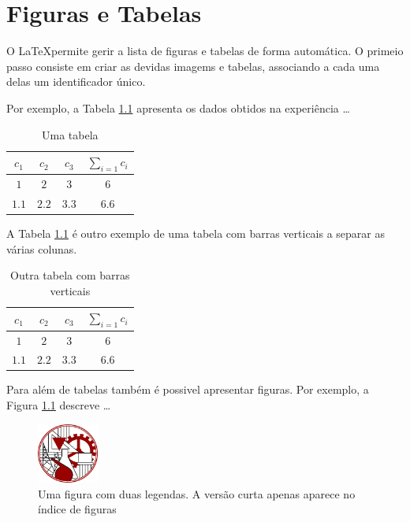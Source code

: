 \chapter{Figuras e Tabelas}
\label{ch:Misch}

O \LaTeX permite gerir a lista de figuras e tabelas de forma automática. O primeio passo consiste em criar as
 devidas imagems e tabelas, associando a cada uma delas um identificador único.

Por exemplo, a Tabela \ref{tab:umaTabela} apresenta os dados obtidos na experiência \ldots
\begin{table}[h]
	\centering
	\caption{Uma tabela}
	\begin{tabular}{ c c c c }
		\hline \hline
		$c_1$ & $c_2$ & $c_3$ & $\sum_{i=1} c_i$ \\
		\hline \hline
		$1$ & $2$ & $3$ & $6$ \\
		$1.1$ & $2.2$ & $3.3$ & $6.6$ \\
		\hline \hline
	\end{tabular}
	\label{tab:umaTabela}
\end{table}

A Tabela \ref{tab:umaTabela} é outro exemplo de uma tabela com barras verticais a separar as várias colunas.

\begin{table}[h]
	\centering
	\caption{Outra tabela com barras verticais}
	\begin{tabular}{ c|c|c|c }
		\hline \hline
		$c_1$ & $c_2$ & $c_3$ & $\sum_{i=1} c_i$ \\
		\hline \hline
		$1$ & $2$ & $3$ & $6$ \\
		$1.1$ & $2.2$ & $3.3$ & $6.6$ \\
		\hline \hline
	\end{tabular}
	\label{tab:outraTabela}
\end{table}

Para além de tabelas também é possivel apresentar figuras. Por exemplo, a Figura \ref{fig:umafigura} descreve \ldots
\begin{figure}[h]
	\centering
	\includegraphics[width=2cm]{./fig_logo_ISEL}
	\caption[Uma figura com duas legendas]{Uma figura com duas legendas. A versão curta apenas aparece no índice de figuras}
	\label{fig:umafigura}
\end{figure}

